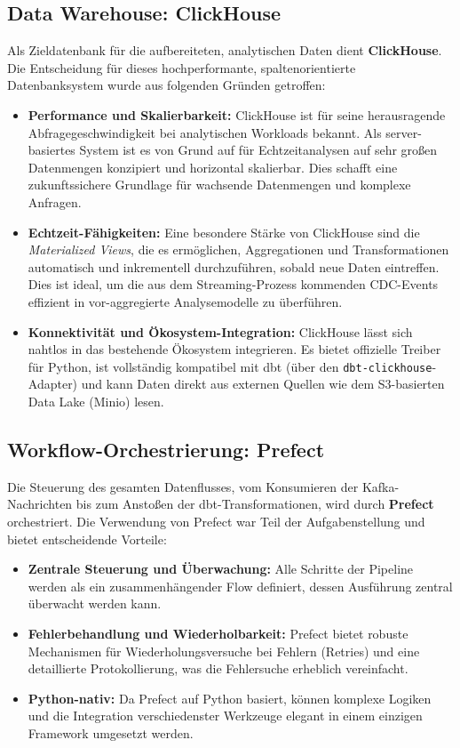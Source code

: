 \documentclass[
    12pt,               
    a4paper,        
    ngerman            
]{scrartcl}
\begin{document}
\subsection{Data Warehouse: ClickHouse}
\label{subsec:clickhouse}

Als Zieldatenbank für die aufbereiteten, analytischen Daten dient \textbf{ClickHouse}. Die Entscheidung für dieses hochperformante, spaltenorientierte Datenbanksystem wurde aus folgenden Gründen getroffen:
\begin{itemize}
    \item \textbf{Performance und Skalierbarkeit:} ClickHouse ist für seine herausragende Abfragegeschwindigkeit bei analytischen Workloads bekannt. Als server-basiertes System ist es von Grund auf für Echtzeitanalysen auf sehr großen Datenmengen konzipiert und horizontal skalierbar. Dies schafft eine zukunftssichere Grundlage für wachsende Datenmengen und komplexe Anfragen.
    \item \textbf{Echtzeit-Fähigkeiten:} Eine besondere Stärke von ClickHouse sind die \textit{Materialized Views}, die es ermöglichen, Aggregationen und Transformationen automatisch und inkrementell durchzuführen, sobald neue Daten eintreffen. Dies ist ideal, um die aus dem Streaming-Prozess kommenden CDC-Events effizient in vor-aggregierte Analysemodelle zu überführen.
    \item \textbf{Konnektivität und Ökosystem-Integration:} ClickHouse lässt sich nahtlos in das bestehende Ökosystem integrieren. Es bietet offizielle Treiber für Python, ist vollständig kompatibel mit dbt (über den \texttt{dbt-clickhouse}-Adapter) und kann Daten direkt aus externen Quellen wie dem S3-basierten Data Lake (Minio) lesen.
\end{itemize}

\subsection{Workflow-Orchestrierung: Prefect}
\label{subsec:prefect}

Die Steuerung des gesamten Datenflusses, vom Konsumieren der Kafka-Nachrichten bis zum Anstoßen der dbt-Transformationen, wird durch \textbf{Prefect} orchestriert. Die Verwendung von Prefect war Teil der Aufgabenstellung und bietet entscheidende Vorteile:
\begin{itemize}
    \item \textbf{Zentrale Steuerung und Überwachung:} Alle Schritte der Pipeline werden als ein zusammenhängender Flow definiert, dessen Ausführung zentral überwacht werden kann.
    \item \textbf{Fehlerbehandlung und Wiederholbarkeit:} Prefect bietet robuste Mechanismen für Wiederholungsversuche bei Fehlern (Retries) und eine detaillierte Protokollierung, was die Fehlersuche erheblich vereinfacht.
    \item \textbf{Python-nativ:} Da Prefect auf Python basiert, können komplexe Logiken und die Integration verschiedenster Werkzeuge elegant in einem einzigen Framework umgesetzt werden.
\end{itemize}
\end{document}
